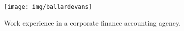 \noindent
\begin{minipage}{.15\textwidth}
\centerline{\texttt{[image: img/ballardevans]}}
\end{minipage}%
\hspace{5mm}
\begin{minipage}{.8\textwidth}
\raggedright
    Work experience in a corporate finance accounting agency.
\end{minipage}